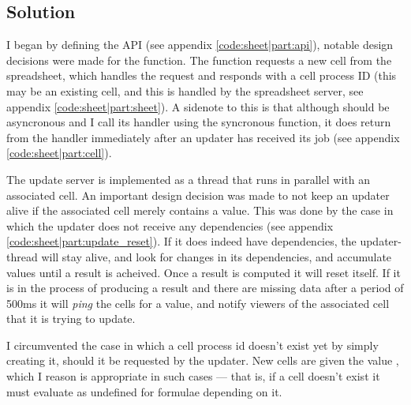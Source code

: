 %
%

\subsection{Solution}
I began by defining the API (see appendix \ref{code:sheet|part:api}), notable
design decisions were made for the  function. The 
function requests a new cell from the spreadsheet, which handles the request
and responds with a cell process ID (this may be an existing cell, and this is
handled by the spreadsheet server, see appendix \ref{code:sheet|part:sheet}).
A sidenote to this is that although  should be asyncronous
and I call its handler using the syncronous  function, it does
return from the handler immediately after an updater has received its job (see
appendix \ref{code:sheet|part:cell}).

The update server is implemented as a thread that runs in parallel with an
associated cell. An important design decision was made to not keep an updater
alive if the associated cell merely contains a value. This was done by the
case in which the updater does not receive any dependencies (see appendix
\ref{code:sheet|part:update_reset}). If it does indeed have dependencies, the
updater-thread will stay alive, and look for changes in its dependencies, and
accumulate values until a result is acheived. Once a result is computed it
will reset itself. If it is in the process of producing a result and there are
missing data after a period of 500ms it will {\it ping} the cells for a value,
and notify viewers of the associated cell that it is trying to update.

I circumvented the case in which a cell process id doesn't exist yet by simply
creating it, should it be requested by the updater. New cells are given the
value , which I reason is appropriate in such cases --- that
is, if a cell doesn't exist it must evaluate as undefined for formulae
depending on it.

